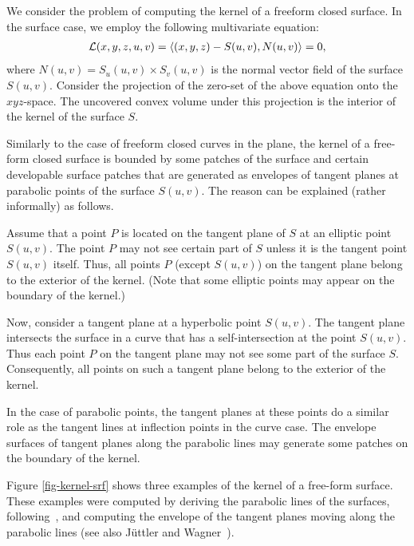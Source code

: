 \documentclass{elsart}
\begin{document}
We consider the problem of computing the kernel of a freeform closed surface.
In the surface case, we employ the following multivariate equation:
\begin{eqnarray}
{\mathcal L}(x,y,z,u,v) = \left<{(x,y,z) - S(u,v)}, {N(u,v)} \right> = 0,
\label{eqn-kernel-srf}
\end{eqnarray}
where $N(u,v) = S_u(u,v) \times S_v(u,v)$ is the normal vector field of the 
surface $S(u,v)$.   Consider the projection of the zero-set of
the above equation onto the $xyz$-space.
%
%
The uncovered convex volume under this projection is
%
%
the interior of the kernel of the surface $S$.

Similarly to the case of freeform closed curves in the plane,
the kernel of a free-form closed surface is bounded
by some patches of the surface and 
certain developable surface patches that are generated as
envelopes of tangent planes at parabolic points of the surface $S(u,v)$.
The reason can be explained (rather informally) as follows.

%
%
Assume that a point $P$ is located on the tangent plane of $S$ at
an elliptic point $S(u,v)$.  The point $P$ may not see
certain part of $S$ unless it is the tangent point $S(u,v)$ itself.
Thus, all points $P$ (except $S(u,v)$) on the tangent plane belong to
the exterior of the kernel.  (Note that some elliptic points
may appear on the boundary of the kernel.)

Now, consider a tangent plane at a hyperbolic point $S(u,v)$.
The tangent plane intersects the surface in a curve
that has a self-intersection at the point $S(u,v)$.
Thus each point $P$ on the tangent plane may not see
some part of the surface $S$.  Consequently, all points
on such a tangent plane belong to the exterior of the kernel.

In the case of parabolic points, the tangent planes
at these points do a similar role as the tangent lines
at inflection points in the curve case.
The envelope surfaces of tangent planes along the parabolic lines
may generate some patches on the boundary of the kernel.

Figure \ref{fig-kernel-srf} shows three examples of the kernel of a 
free-form surface. These examples were computed by deriving the parabolic
lines of the surfaces, following~\cite{Elber93}, and computing the 
envelope of the tangent planes moving along the parabolic lines
(see also J\"uttler and Wagner~\cite{JW99}).
\end{document}
